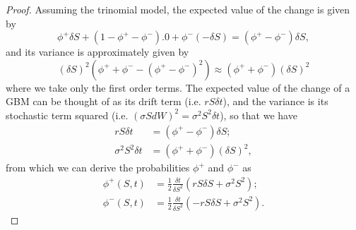 \begin{proof}
Assuming the trinomial model, the expected value of the change is given by
\begin{equation}
\phi^+\delta S+(1-\phi^+-\phi^-).0+\phi^-(-\delta S)=(\phi^+-\phi^-)\delta S,
\end{equation}
\noindent and its variance is approximately given by
\begin{equation}
(\delta S)^2(\phi^++\phi^--(\phi^+-\phi^-)^2)\approx (\phi^++\phi^-)(\delta S)^2
\end{equation}
\noindent where we take only the first order terms. The expected value of the change of a GBM can be thought of as its drift term (i.e. $rS\delta t$), and the variance is its stochastic term squared (i.e. $(\sigma SdW)^2=\sigma^2S^2\delta t$), so that we have
\begin{equation}
\begin{split}
rS\delta t&=(\phi^+-\phi^-)\delta S;\\
\sigma^2S^2\delta t&=(\phi^++\phi^-)(\delta S)^2,
\end{split}
\end{equation}
\noindent from which we can derive the probabilities $\phi^+$ and $\phi^-$ as
\begin{equation}
\begin{split}
\phi^+(S,t)&=\frac{1}{2}\frac{\delta t}{\delta S^2}(rS\delta S+\sigma^2S^2);\\
\phi^-(S,t)&=\frac{1}{2}\frac{\delta t}{\delta S^2}(-rS\delta S+\sigma^2S^2).
\end{split}
\end{equation}


\end{proof}
